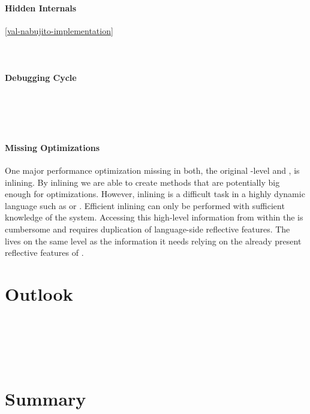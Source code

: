 \paragraph{Hidden \VM Internals}
\ref{val-nabujito-implementation}
\\
 \\
 \\


\paragraph{Debugging Cycle}
 \\
 \\
 \\

\paragraph{Missing Optimizations}
One major performance optimization missing in both, the original \PH \VM-level \JIT and \NBJ, is inlining. 
By inlining we are able to create methods that are potentially big enough for optimizations.
However, inlining is a difficult task in a highly dynamic language such as \ST or \Self \cite{Cham89a}. 
Efficient inlining can only be performed with sufficient knowledge of the system. 
Accessing this high-level information from within the \VM is cumbersome and requires duplication of language-side reflective features.
The \JIT lives on the same level as the information it needs relying on the already present reflective features of \ST.


\section{Outlook}

 \\
 \\
 \\
 \\

\section{Summary}


